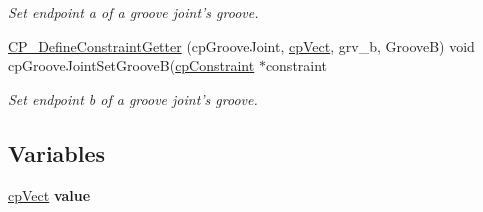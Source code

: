 \begin{DoxyCompactItemize}
\begin{DoxyCompactList}\small\item\em Set endpoint a of a groove joint's groove. \end{DoxyCompactList}\item 
\hypertarget{group__cp_groove_joint_ga05a054f39842ddc8f5d3e92eb6ce5d71}{\hyperlink{group__cp_groove_joint_ga05a054f39842ddc8f5d3e92eb6ce5d71}{C\-P\-\_\-\-Define\-Constraint\-Getter} (cp\-Groove\-Joint, \hyperlink{structcp_vect}{cp\-Vect}, grv\-\_\-b, Groove\-B) void cp\-Groove\-Joint\-Set\-Groove\-B(\hyperlink{structcp_constraint}{cp\-Constraint} $\ast$constraint}\label{group__cp_groove_joint_ga05a054f39842ddc8f5d3e92eb6ce5d71}

\begin{DoxyCompactList}\small\item\em Set endpoint b of a groove joint's groove. \end{DoxyCompactList}\end{DoxyCompactItemize}
\subsection*{Variables}
\begin{DoxyCompactItemize}
\item 
\hypertarget{group__cp_groove_joint_gaca07d677c65b0471cdcd2a05fb684634}{\hyperlink{structcp_vect}{cp\-Vect} {\bfseries value}}\label{group__cp_groove_joint_gaca07d677c65b0471cdcd2a05fb684634}

\end{DoxyCompactItemize}

